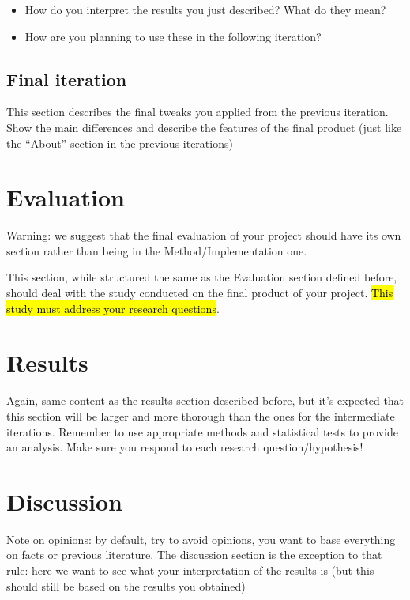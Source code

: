 \documentclass[conference]{IEEEtran}
\begin{document}
\begin{itemize}
	\item How do you interpret the results you just described? What do they mean?
	\item How are you planning to use these in the following iteration?
\end{itemize}


\subsection{Final iteration}

This section describes the final tweaks you applied from the previous iteration. Show the main differences and describe the features of the final product (just like the “About” section in the previous iterations)

\section{Evaluation}

\begin{displayquote}
{\color{red}
Warning: we suggest that the final evaluation of your project should have its own section rather than being in the Method/Implementation one.
}
\end{displayquote}

This section, while structured the same as the Evaluation section defined before, should deal with the study conducted on the final product of your project. \hl{This study must address your research questions}. 


\section{Results}

Again, same content as the results section described before, but it’s expected that this section will be larger and more thorough than the ones for the intermediate iterations. Remember to use appropriate methods and statistical tests to provide an analysis. Make sure you respond to each research question/hypothesis!

\section{Discussion}

\begin{displayquote}
{\color{red}
Note on opinions: by default, try to avoid opinions, you want to base everything on facts or previous literature. The discussion section is the exception to that rule: here we want to see what your interpretation of the results is (but this should still be based on the results you obtained)
}
\end{displayquote}
\end{document}
